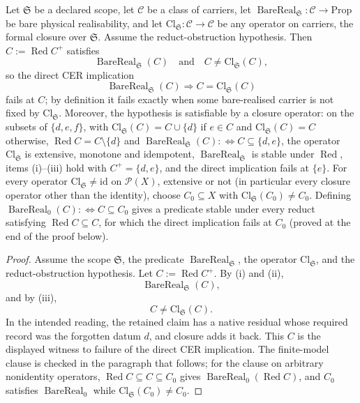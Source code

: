 \begin{theorem}\label{thm:CER-direct-no-go}
Let \(\mathfrak S\) be a declared scope, let \(\mathcal C\) be a
class of carriers, let
\(\operatorname{BareReal}_{\mathfrak S}:\mathcal C\to\mathrm{Prop}\)
be bare physical realisability, and let
\(\mathrm{Cl}_{\mathfrak S}:\mathcal C\to\mathcal C\) be any operator on
carriers, the formal closure over \(\mathfrak S\).
Assume the reduct-obstruction hypothesis. Then \(C:=\operatorname{Red}C^{+}\) satisfies
\[
  \operatorname{BareReal}_{\mathfrak S}(C)
  \quad\text{and}\quad
  C\ne \mathrm{Cl}_{\mathfrak S}(C),
\]
so the direct CER implication
\[
  \operatorname{BareReal}_{\mathfrak S}(C)
  \Longrightarrow
  C=\mathrm{Cl}_{\mathfrak S}(C)
\]
fails at \(C\); by definition it fails exactly when some bare-realised carrier is not fixed by \(\mathrm{Cl}_{\mathfrak S}\). Moreover, the hypothesis is satisfiable by a closure
operator: on the subsets of \(\{d,e,f\}\), with
\(\mathrm{Cl}_{\mathfrak S}(C)=C\cup\{d\}\) if \(e\in C\) and
\(\mathrm{Cl}_{\mathfrak S}(C)=C\) otherwise, \(\operatorname{Red}C=C\setminus\{d\}\)
and \(\operatorname{BareReal}_{\mathfrak S}(C):\Longleftrightarrow C\subseteq\{d,e\}\),
the operator \(\mathrm{Cl}_{\mathfrak S}\) is extensive, monotone and
idempotent, \(\operatorname{BareReal}_{\mathfrak S}\) is stable under
\(\operatorname{Red}\), items (i)--(iii) hold with \(C^{+}=\{d,e\}\), and the
direct implication fails at \(\{e\}\). For every operator
\(\mathrm{Cl}_{\mathfrak S}\ne\mathrm{id}\) on \(\mathcal P(X)\), extensive or not (in particular every closure operator other than the identity), choose \(C_0\subseteq X\)
with \(\mathrm{Cl}_{\mathfrak S}(C_0)\ne C_0\). Defining
\(\operatorname{BareReal}_0(C):\Longleftrightarrow C\subseteq C_0\) gives a predicate
stable under every reduct satisfying \(\operatorname{Red}C\subseteq C\), for which
the direct implication fails at \(C_0\) (proved at the end of the proof below).
\end{theorem}
\begin{proof}
Assume the scope \(\mathfrak S\), the predicate
\(\operatorname{BareReal}_{\mathfrak S}\), the operator
\(\mathrm{Cl}_{\mathfrak S}\), and the reduct-obstruction
hypothesis.  Let \(C:=\operatorname{Red}C^{+}\). By (i) and (ii),
\[
  \operatorname{BareReal}_{\mathfrak S}(C),
\]
and by (iii),
\[
  C\ne \mathrm{Cl}_{\mathfrak S}(C).
\]
In the intended reading, the retained claim has a native residual whose
required record was the forgotten datum \(d\), and closure adds it back.
This \(C\) is the displayed witness to failure of the direct CER
implication. The finite-model clause is checked in the paragraph that follows; for the clause on arbitrary nonidentity operators, \(\operatorname{Red}C\subseteq C\subseteq C_0\) gives \(\operatorname{BareReal}_0(\operatorname{Red}C)\), and \(C_0\) satisfies \(\operatorname{BareReal}_0\) while \(\mathrm{Cl}_{\mathfrak S}(C_0)\neq C_0\).
\end{proof}

